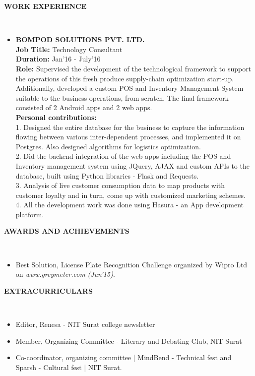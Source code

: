 \documentclass[a4paper]{article}
\newcommand{\lsep}{-0.5cm}
\newcommand{\resheading}[1]{{\small \colorbox{mygrey}{\begin{minipage}{0.975\textwidth}{\textbf{#1 \vphantom{p\^{E}}}}\end{minipage}}}}
\begin{document}
\resheading{\textbf{WORK EXPERIENCE} }\\[\lsep]
\begin{itemize}
\item \noindent \textbf{BOMPOD SOLUTIONS PVT. LTD.} \\
\textbf{Job Title:} Technology Consultant \\
\textbf{Duration:} Jan'16 - July'16 \\
\textbf{Role:} Supervised the development of the technological framework to support the operations of this fresh produce supply-chain optimization start-up. Additionally, developed a custom POS and Inventory Management System suitable to the business operations, from scratch. The final framework consisted of 2 Android apps and 2 web apps. \\
\textbf{Personal contributions:} \\ 1. Designed the entire database for the business to capture the information flowing between various inter-dependent processes, and implemented it on Postgres. Also designed algorithms for logistics optimization.\\ 2. Did the backend integration of the web apps including the POS and Inventory management system using JQuery, AJAX and custom APIs to the database, built using Python libraries - Flask and Requests. \\
3. Analysis of live customer consumption data to map products with customer loyalty and in turn, come up with customized marketing schemes. \\
4. All the development work was done using Hasura - an App development platform.
\end{itemize}

\resheading{\textbf{AWARDS AND ACHIEVEMENTS} }\\[\lsep]
\begin{itemize}
\item \noindent Best Solution, License Plate Recognition Challenge organized by Wipro Ltd on \textit{www.greymeter.com} \emph{(Jun'15)}.
\end{itemize} 

\resheading{\textbf{EXTRACURRICULARS} }\\[\lsep]
\begin{itemize}
\item \noindent Editor, Renesa - NIT Surat college newsletter
\vspace*{-1.5mm}
\item \noindent Member, Organizing Committee - Literary and Debating Club, NIT Surat
\vspace*{-1.5mm}
\item \noindent Co-coordinator, organizing committee | MindBend - Technical fest and Sparsh - Cultural fest | NIT Surat.
\end{itemize}
\end{document}
